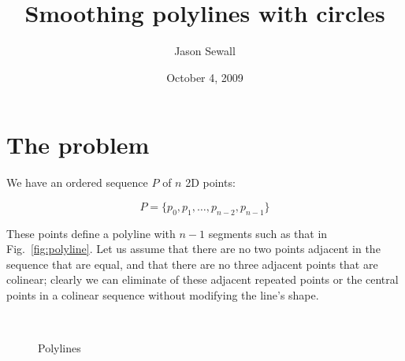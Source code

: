 \documentclass{article}
\title{Smoothing polylines with circles}
\author{Jason Sewall}
\date{October 4, 2009}
\begin{document}
\maketitle

\section{The problem}
We have an ordered sequence $P$ of $n$ 2D points:

\begin{equation}
  \label{eq:points}
  P = \{ p_{0}, p_{1},\ldots,p_{n-2},p_{n-1}\}
\end{equation}

These points define a polyline with $n-1$ segments such as that in Fig.~\ref{fig:polyline}.  Let us assume that there are no two points adjacent in the sequence that are equal, and that there are no three adjacent points that are colinear; clearly we can eliminate of these adjacent repeated points or the central points in a colinear sequence without modifying the line's shape.

\begin{figure}[h]
  \centering
  \hfill
  \\
  \caption{Polylines}
\end{figure}
\end{document}
